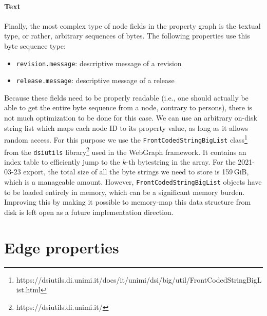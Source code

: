 \paragraph{Text}

Finally, the most complex type of node fields in the property graph is the
textual type, or rather, arbitrary sequences of bytes. The following properties
use this byte sequence type:

\begin{itemize}
    \setlength\itemsep{0em}
    \item \texttt{revision.message}: descriptive message of a revision
    \item \texttt{release.message}: descriptive message of a release
\end{itemize}

Because these fields need to be properly readable (i.e., one should actually be
able to get the entire byte sequence from a node, contrary to persons), there
is not much optimization to be done for this case. We can use an arbitrary
on-disk string list which maps each node ID to its property value, as long as
it allows random access. For this purpose we use the
\texttt{FrontCodedStringBigList}
class\footnote{https://dsiutils.di.unimi.it/docs/it/unimi/dsi/big/util/FrontCodedStringBigList.html}
from the \texttt{dsiutils} library\footnote{https://dsiutils.di.unimi.it/} used
in the WebGraph framework. It contains an index table to efficiently jump to
the $k$-th bytestring in the array.
For the 2021-03-23 export, the total size of all the byte strings we need to
store is 159\,GiB, which is a manageable amount.  However,
\texttt{FrontCodedStringBigList} objects have to be loaded entirely in memory,
which can be a significant memory burden. Improving this by making it possible
to memory-map this data structure from disk is left open as a future
implementation direction.

\section{Edge properties}
